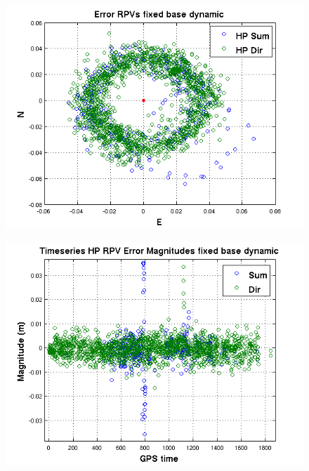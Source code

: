 \begin{figure}[ht] \centering \label{fig:fixed_dynamic_err_rpv}
    \includegraphics[width=6.5in]{./figs/fixed_dynamic_error_rpv.png}
    \caption{}
\end{figure}

\begin{figure}[ht] \centering \label{fig:fixed_dynamic_err_mag}
    \includegraphics[width=6.5in]{./figs/fixed_dynamic_err_mags.png}
    \caption{}
\end{figure}



